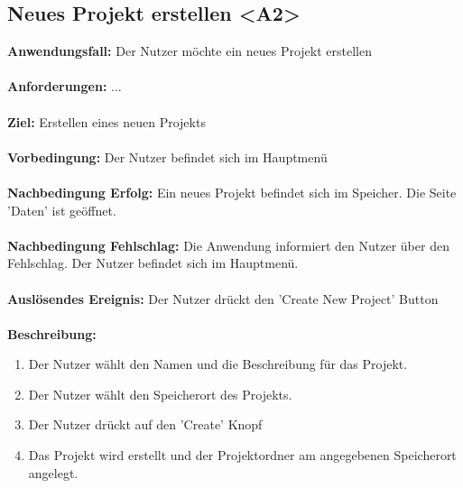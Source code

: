 \documentclass[parskip=full]{scrartcl} %
\begin{document}
\subsection*{Neues Projekt erstellen <A2>}
\textbf{Anwendungsfall:} Der Nutzer möchte ein neues Projekt erstellen\\\\
\textbf{Anforderungen:} ...\\\\
\textbf{Ziel:} Erstellen eines neuen Projekts \\\\
\textbf{Vorbedingung:} Der Nutzer befindet sich im Hauptmenü \\\\
\textbf{Nachbedingung Erfolg:} Ein neues Projekt befindet sich im Speicher. Die Seite 'Daten' ist geöffnet.  \\\\
\textbf{Nachbedingung Fehlschlag:} Die Anwendung informiert den Nutzer über den Fehlschlag. Der Nutzer befindet sich im Hauptmenü. \\\\
\textbf{Auslösendes Ereignis:} Der Nutzer drückt den 'Create New Project' Button \\\\
\textbf{Beschreibung:}
\begin{enumerate}
    \item Der Nutzer wählt den Namen und die Beschreibung für das Projekt.
    \item Der Nutzer wählt den Speicherort des Projekts.
    \item Der Nutzer drückt auf den 'Create' Knopf
    \item Das Projekt wird erstellt und der Projektordner am angegebenen Speicherort angelegt.
\end{enumerate}
\newpage
\end{document}
